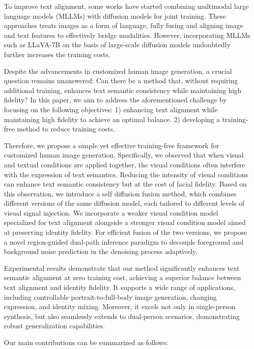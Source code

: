 To improve text alignment, some works \cite{pan2023kosmos, li2024blip,song2024moma} have started combining multimodal large language models (MLLMs) with diffusion models for joint training. These approaches treats images as a form of language, fully fusing and aligning image and text features to effectively bridge modalities.
However, incorporating MLLMs such as LLaVA-7B \cite{liu2023llava} on the basis of large-scale diffusion models undoubtedly further increases the training costs.

Despite the advancements in customized human image generation, a crucial question remains unanswered: Can there be a method that, without requiring additional training, enhances text semantic consistency while maintaining high fidelity? In this paper, we aim to address the aforementioned challenge by focusing on the following objectives: 1) enhancing text alignment while maintaining high fidelity to achieve an optimal balance. 2) developing a training-free method to reduce training costs.

Therefore, we propose a simple yet effective training-free framework for customized human image generation. Specifically, we observed that when visual and textual conditions are applied together, the visual conditions often interfere with the expression of text semantics. Reducing the intensity of visual conditions can enhance text semantic consistency but at the cost of facial fidelity. Based on this observation, we introduce a self diffusion fusion method, which combines different versions of the same diffusion model, each tailored to different levels of visual signal injection. We incorporate a weaker visual condition model specialized for text alignment alongside a stronger visual condition model aimed at preserving identity fidelity. For efficient fusion of the two versions, we propose a novel region-guided dual-path inference paradigm to decouple foreground and background noise prediction in the denoising process adaptively.

Experimental results demonstrate that our method significantly enhances text semantic alignment at zero training cost, achieving a superior balance between text alignment and identity fidelity. It supports a wide range of applications, including controllable portrait-to-full-body image generation, changing expression, and identity mixing. Moreover, it excels not only in single-person synthesis, but also seamlessly extends to dual-person scenarios, demonstrating robust generalization capabilities.

Our main contributions can be summarized as follows:

